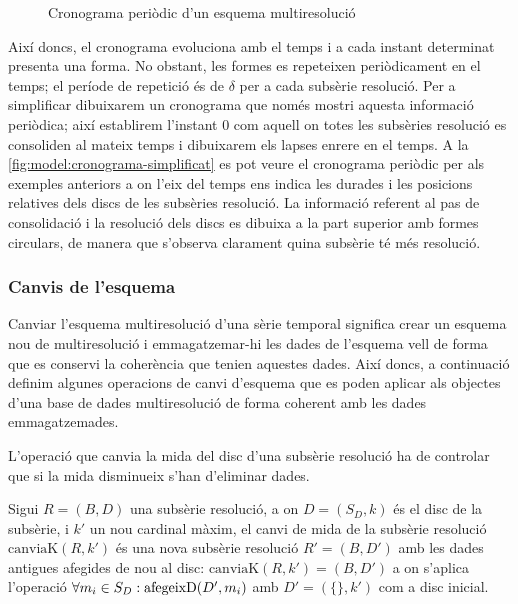 \begin{figure}[tp]
  \centering
  
  \caption{Cronograma periòdic d'un esquema multiresolució}
  \label{fig:model:cronograma-simplificat}
\end{figure}

Així doncs, el cronograma evoluciona amb el temps i a cada instant
determinat presenta una forma. No obstant, les formes es repeteixen
periòdicament en el temps; el període de repetició és de $\delta$ per
a cada subsèrie resolució. Per a simplificar dibuixarem un cronograma
que només mostri aquesta informació periòdica; així establirem
l'instant 0 com aquell on totes les subsèries resolució es consoliden
al mateix temps i dibuixarem els lapses enrere en el temps. A la
\autoref{fig:model:cronograma-simplificat} es pot veure el cronograma
periòdic per als exemples anteriors a on l'eix del temps ens indica
les durades i les posicions relatives dels discs de les subsèries
resolució. La informació referent al pas de consolidació i la
resolució dels discs es dibuixa a la part superior amb formes
circulars, de manera que s'observa clarament quina subsèrie té més
resolució.







\subsubsection{Canvis de l'esquema}

Canviar l'esquema multiresolució d'una sèrie temporal significa crear
un esquema nou de multiresolució i emmagatzemar-hi les dades de
l'esquema vell de forma que es conservi la coherència que tenien
aquestes dades. Així doncs, a continuació definim algunes operacions
de canvi d'esquema que es poden aplicar als objectes d'una base de
dades multiresolució de forma coherent amb les dades emmagatzemades.


L'operació que canvia la mida del disc d'una subsèrie resolució ha de
controlar que si la mida disminueix s'han d'eliminar dades.
\begin{definition}
  Sigui $R=(B,D)$ una subsèrie resolució, a on $D=(S_D,k)$ és el disc
  de la subsèrie, i $k'$ un nou cardinal màxim, el canvi de mida de la
  subsèrie resolució $\text{canviaK}(R,k')$ és una nova subsèrie
  resolució $R'=(B,D')$ amb les dades antigues afegides de nou al
  disc: $\text{canviaK}(R,k')= (B,D')$ a on s'aplica l'operació
  $\forall m_i \in S_D: \operatorname*{afegeixD}(D',m_i)$ amb $D'=(\{\},k')$ com a disc
  inicial.
\end{definition}


